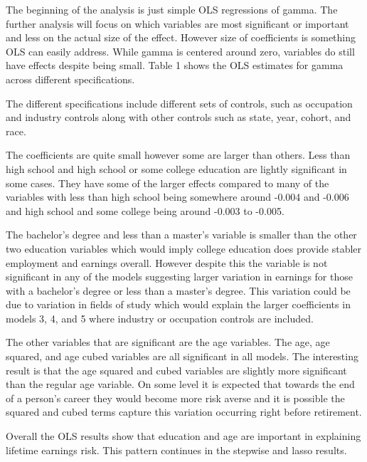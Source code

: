\documentclass[12pt]{article}
\begin{document}
\begin{onehalfspace}


The beginning of the analysis is just simple OLS regressions of gamma. The further analysis will focus on which variables are most significant or important and less on the actual size of the effect. However size of coefficients is something OLS can easily address. While gamma is centered around zero, variables do still have effects despite being small. Table 1 shows the OLS estimates for gamma across different specifications. 

The different specifications include different sets of controls, such as occupation and industry controls along with other controls such as state, year, cohort, and race.

The coefficients are quite small however some are larger than others. Less than high school and high school or some college education are lightly significant in some cases. They have some of the larger effects compared to many of the variables with less than high school being somewhere around -0.004 and -0.006 and high school and some college being around -0.003 to -0.005. 

The bachelor's degree and less than a master's variable is smaller than the other two education variables which would imply college education does provide stabler employment and earnings overall. However despite this the variable is not significant in any of the models suggesting larger variation in earnings for those with a bachelor's degree or less than a master's degree. This variation could be due to variation in fields of study which would explain the larger coefficients in models 3, 4, and 5 where industry or occupation controls are included.


The other variables that are significant are the age variables. The age, age squared, and age cubed variables are all significant in all models. The interesting result is that the age squared and cubed variables are slightly more significant than the regular age variable. On some level it is expected that towards the end of a person's career they would become more risk averse and it is possible the squared and cubed terms capture this variation occurring right before retirement. 

Overall the OLS results show that education and age are important in explaining lifetime earnings risk. This pattern continues in the stepwise and lasso results.



\end{onehalfspace}
\end{document}
